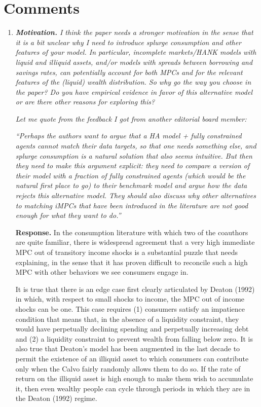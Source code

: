 \documentclass[12pt,letterpaper,english]{article}
\begin{document}
\section{Comments}
\begin{enumerate}
	
\item \textit{\textbf{Motivation.} I think the paper needs a stronger motivation in the sense that it is a bit unclear why I need to introduce splurge consumption and other features of your model. In particular, incomplete markets/HANK models with liquid and	illiquid assets, and/or models with spreads between borrowing and savings rates, can potentially account for both MPCs and for the relevant features of the (liquid)	wealth distribution. So why go the way you choose in the paper? Do you have empirical evidence in favor of this alternative model or are there other reasons for exploring this?}

\textit{Let me quote from the feedback I got from another editorial board member:}

\textit{``Perhaps the authors want to argue that a HA model + fully constrained agents	cannot match their data targets, so that one needs something else, and splurge	consumption is a natural solution that also seems intuitive. But then they need to make this argument explicit: they need to compare a version of their model with a fraction of fully constrained agents (which would be the natural first place to go)	to their benchmark model and argue how the data rejects this alternative model. They should also discuss why other alternatives to matching iMPCs that have been	introduced in the literature are not good enough for what they want to do.''}	

\noindent \textbf{Response.} In the consumption literature with which two of the coauthors are quite familiar, there is widespread agreement that a very high immediate MPC out of transitory income shocks is a substantial puzzle that needs explaining, in the sense that it has proven difficult to reconcile such a high MPC with other behaviors we see consumers engage in.

It is true that there is an edge case first clearly articulated by Deaton (1992) in which, with respect to small shocks to income, the MPC out of income shocks can be one. This case requires (1) consumers satisfy an impatience condition that means that, in the absence of a liquidity constraint, they would have perpetually declining spending and perpetually increasing debt and (2) a liquidity constraint to prevent wealth from falling below zero. It is also true that Deaton's model has been augmented in the last decade to permit the existence of an illiquid asset to which consumers can contribute only when the Calvo fairly randomly allows them to do so.  If the rate of return on the illiquid asset is high enough to make them wish to accumulate it, then even wealthy people can cycle through periods in which they are in the Deaton (1992) regime.


\end{enumerate}
\end{document}
